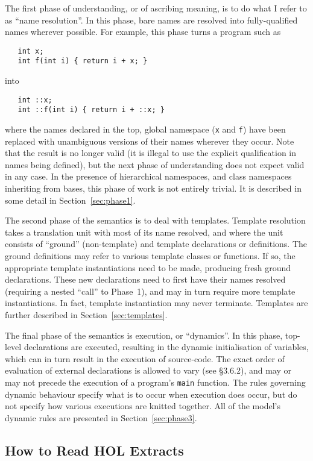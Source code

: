 \documentclass[11pt]{article}
\begin{document}
The first phase of understanding, or of ascribing meaning, is to do
what I refer to as ``name resolution''.  In this phase, bare names are
resolved into fully-qualified names wherever possible.  For example,
this phase turns a program such as
\begin{verbatim}
   int x;
   int f(int i) { return i + x; }
\end{verbatim}
into
\begin{verbatim}
   int ::x;
   int ::f(int i) { return i + ::x; }
\end{verbatim}
where the names declared in the top, global namespace (\texttt{x} and
\texttt{f}) have been replaced with unambiguous versions of their
names wherever they occur.  Note that the result is no longer valid
\cpp{} (it is illegal to use the explicit qualification in names being
defined), but the next phase of understanding does not expect valid
\cpp{} in any case.  In the presence of hierarchical namespaces, and
class namespaces inheriting from bases, this phase of work is not
entirely trivial.  It is described in some detail in
Section~\ref{sec:phase1}.

The second phase of the semantics is to deal with templates.  Template
resolution takes a translation unit with most of its name resolved,
and where the unit consists of ``ground'' (non-template) and template
declarations or definitions.  The ground definitions may refer to
various template classes or functions.  If so, the appropriate
template instantiations need to be made, producing fresh ground
declarations.  These new declarations need to first have their names
resolved (requiring a nested ``call'' to Phase~1), and may in turn
require more template instantiations.  In fact, template instantiation
may never terminate.  Templates are further described in
Section~\ref{sec:templates}.

The final phase of the semantics is execution, or ``dynamics''.  In
this phase, top-level declarations are executed, resulting in the
dynamic initialisation of variables, which can in turn result in the
execution of source-code.  The exact order of evaluation of external
declarations is allowed to vary (see \S3.6.2), and may or may not
precede the execution of a program's \texttt{main} function.  The
rules governing dynamic behaviour specify what is to occur when
execution does occur, but do not specify how various executions are
knitted together.  All of the model's dynamic rules are presented in
Section~\ref{sec:phase3}.

\subsection{How to Read HOL Extracts}
\end{document}
